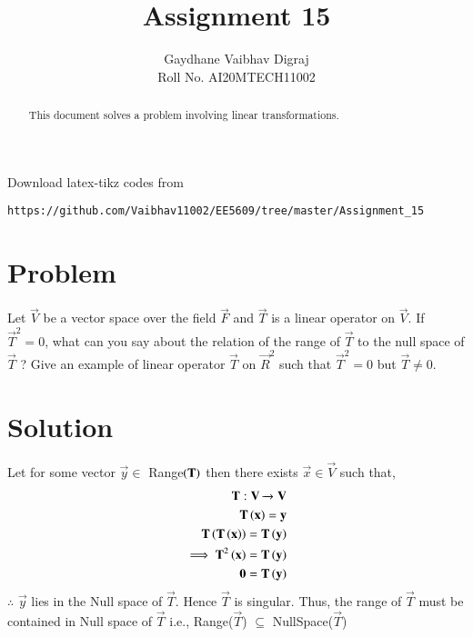 \documentclass[journal,12pt,twocolumn]{IEEEtran}
\begin{document}
     \def\rightbox#1{\makebox[0in][r]{#1}}
     \def\centbox#1{\makebox[0in]{#1}}
     \def\topbox#1{\raisebox{-\baselineskip}[0in][0in]{#1}}
     \def\midbox#1{\raisebox{-0.5\baselineskip}[0in][0in]{#1}}
\vspace{3cm}
\title{Assignment 15}
\author{Gaydhane Vaibhav Digraj \\ Roll No. AI20MTECH11002}
\maketitle
\newpage
\bigskip
\renewcommand{\thefigure}{\theenumi}
\renewcommand{\thetable}{\theenumi}
\begin{abstract}
This document solves a problem involving linear transformations.
\end{abstract}
%
Download latex-tikz codes from 
%
\begin{lstlisting}
https://github.com/Vaibhav11002/EE5609/tree/master/Assignment_15
\end{lstlisting}
%
\section{Problem}
Let $\vec{V}$ be a vector space over the field $\vec{F}$ and $\vec{T}$ is a linear operator on $\vec{V}$. If $\vec{T}^2=0$, what can you say about the relation of the range of $\vec{T}$ to the null space of $\vec{T}$ ?
Give an example of linear operator $\vec{T}$ on $\vec{R}^2$ such that $\vec{T}^2=0$ but $\vec{T}\ne0$.

\section{Solution}
Let for some vector $\vec{y}\in $ Range$\left(\mathbf{T}\right)$ then there exists $\vec{x} \in \vec{V}$ such that,
\begin{align}
    \mathbf{T} : \mathbf{V} \xrightarrow{} \mathbf{V} \\
    \mathbf{T}\left(\mathbf{x}\right) = \mathbf{y} \\
    \mathbf{T}\left(\mathbf{T}\left(\mathbf{x}\right)\right) = \mathbf{T}\left(\mathbf{y}\right) \\
    \implies\mathbf{T}^2\left(\mathbf{x}\right) = \mathbf{T}\left(\mathbf{y}\right) \\
    \mathbf{0} = \mathbf{T}\left(\mathbf{y}\right)
\end{align}
$\therefore$ $\vec{y}$ lies in the Null space of $\vec{T}$. Hence $\vec{T}$ is singular. Thus, the range of $\vec{T}$ must be contained in Null space of $\vec{T}$ i.e.,
Range($\vec{T}$) $\subseteq$ NullSpace($\vec{T}$)
\end{document}
